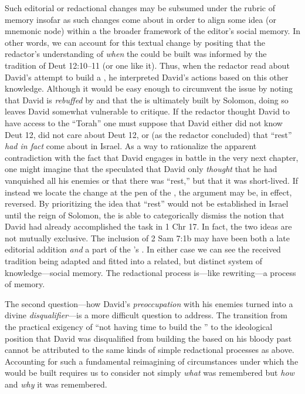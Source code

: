 Such editorial or redactional changes may be subsumed under the rubric of memory insofar as such changes come about in order to align some idea (or mnemonic node) within a the broader framework of the editor's social memory. In other words, we can account for this textual change by positing that the redactor's understanding of \emph{when} the \temple could be built was informed by the tradition of Deut 12:10--11 (or one like it). Thus, when the redactor read about David's attempt to build a \temple, he interpreted David's actions based on this other knowledge. Although it would be easy enough to circumvent the issue by noting that David is \emph{rebuffed} by \yahweh and that the \temple is ultimately built by Solomon, doing so leaves David somewhat vulnerable to critique. If the redactor thought David to have access to the ``Torah'' one must suppose that David either did not know Deut 12, did not care about Deut 12, or (as the redactor concluded) that ``rest'' \emph{had in fact} come about in Israel. As a way to rationalize the apparent contradiction with the fact that David engages in battle in the very next chapter, one might imagine that the \chronicler speculated that David only \emph{thought} that he had vanquished all his enemies or that there was ``rest,'' but that it was short-lived. If instead we locate the change at the pen of the \chronicler, the argument may be, in effect, reversed. By prioritizing the idea that ``rest'' would not be established in Israel until the reign of Solomon, the \chronicler is able to categorically dismiss the notion that David had already accomplished the task in 1 Chr 17. In fact, the two ideas are not mutually exclusive. The inclusion of 2 Sam 7:1b may have been both a late editorial addition \emph{and} a part of the \chronicler's \vorlage. In either case we can see the received tradition being adapted and fitted into a related, but distinct system of knowledge---social memory. The redactional process is---like rewriting---a process of memory.

The second question---how David's \emph{preoccupation} with his enemies turned into a divine \emph{disqualifier}---is a more difficult question to address. The transition from the practical exigency of ``not having time to build the \temple'' to the ideological position that David was disqualified from building the \temple based on his bloody past cannot be attributed to the same kinds of simple redactional processes as above. Accounting for such a fundamental reimagining of circumstances under which the \temple would be built requires us to consider not simply \emph{what} was remembered but \emph{how} and \emph{why} it was remembered. 

